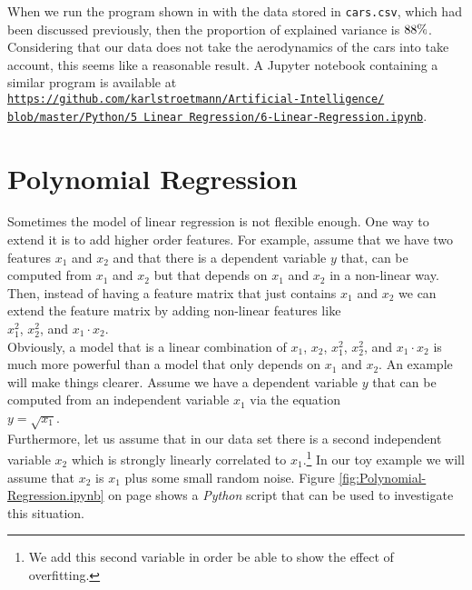 When we run the program shown in  with the data stored in \texttt{cars.csv},
which had been discussed previously, then the proportion of explained variance is $88 \mathtt{\symbol{37}}$.  Considering that our data does
not take the aerodynamics of the cars into take account, this seems like a reasonable result.  A Jupyter notebook
containing a similar program is available at
\\[0.2cm]
\hspace*{1.3cm}
\href{https://github.com/karlstroetmann/Artificial-Intelligence/blob/master/Python/5 Linear Regression/6-Linear-Regression.ipynb}{\texttt{https://github.com/karlstroetmann/Artificial-Intelligence/\\
\hspace*{2.2cm}
 blob/master/Python/5 Linear Regression/6-Linear-Regression.ipynb}}.

\section{Polynomial Regression}
Sometimes the model of linear regression is not flexible enough.  One way to extend it is to add higher order
features.  For example, assume that we have two features $x_1$ and $x_2$ and that there is a dependent variable
$y$ that,  can be computed from $x_1$ and $x_2$ but that depends on $x_1$ and $x_2$ in a non-linear way.
Then, instead of having a feature matrix that just contains $x_1$ and $x_2$ we can extend the feature matrix by
adding non-linear features like
\\[0.2cm]
\hspace*{1.3cm}
$x_1^2$, $x_2^2$, and $x_1 \cdot x_2$.
\\[0.2cm]
Obviously, a model that is a linear combination of $x_1$, $x_2$, $x_1^2$, $x_2^2$, and $x_1 \cdot x_2$ is much
more powerful than a model that only depends on $x_1$ and $x_2$.  An example will make things clearer.
Assume we have a dependent variable $y$ that can be computed from an independent variable $x_1$ via the
equation
\\[0.2cm]
\hspace*{1.3cm}
$y = \sqrt{x_1}$.
\\[0.2cm]
Furthermore, let us assume that in our data set there is a second independent variable $x_2$ which is strongly
linearly correlated to $x_1$.\footnote{
  We add this second variable in order be able to show the effect of overfitting.
}
In our toy example we will assume that $x_2$ is $x_1$ plus some small random noise.
Figure \ref{fig:Polynomial-Regression.ipynb} on page \pageref{fig:Polynomial-Regression.ipynb} shows a
\textsl{Python} script that can be used to investigate this situation.



